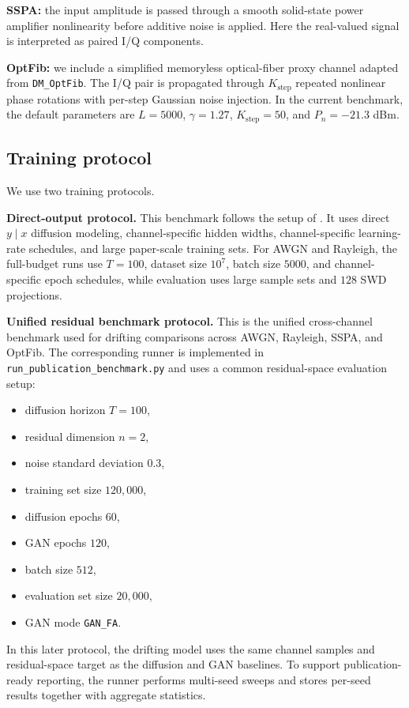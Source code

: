 \textbf{SSPA:}
the input amplitude is passed through a smooth solid-state power amplifier nonlinearity before additive noise is applied.
Here the real-valued signal is interpreted as paired I/Q components.

\textbf{OptFib:}
we include a simplified memoryless optical-fiber proxy channel adapted from \texttt{DM\_OptFib}.
The I/Q pair is propagated through \(K_{\text{step}}\) repeated nonlinear phase rotations with per-step Gaussian noise injection.
In the current benchmark, the default parameters are \(L = 5000\), \(\gamma = 1.27\), \(K_{\text{step}} = 50\), and \(P_n = -21.3\) dBm.

\subsection{Training protocol}
We use two training protocols.

\textbf{Direct-output protocol.}
This benchmark follows the setup of \cite{paper2309}.
It uses direct \(y \mid x\) diffusion modeling, channel-specific hidden widths, channel-specific learning-rate schedules, and large paper-scale training sets.
For AWGN and Rayleigh, the full-budget runs use \(T=100\), dataset size \(10^7\), batch size \(5000\), and channel-specific epoch schedules, while evaluation uses large sample sets and \(128\) SWD projections.

\textbf{Unified residual benchmark protocol.}
This is the unified cross-channel benchmark used for drifting comparisons across AWGN, Rayleigh, SSPA, and OptFib.
The corresponding runner is implemented in \texttt{run\_publication\_benchmark.py} and uses a common residual-space evaluation setup:
\begin{itemize}
\item diffusion horizon \(T=100\),
\item residual dimension \(n=2\),
\item noise standard deviation \(0.3\),
\item training set size \(120{,}000\),
\item diffusion epochs \(60\),
\item GAN epochs \(120\),
\item batch size \(512\),
\item evaluation set size \(20{,}000\),
\item GAN mode \texttt{GAN\_FA}.
\end{itemize}
In this later protocol, the drifting model uses the same channel samples and residual-space target as the diffusion and GAN baselines.
To support publication-ready reporting, the runner performs multi-seed sweeps and stores per-seed results together with aggregate statistics.

